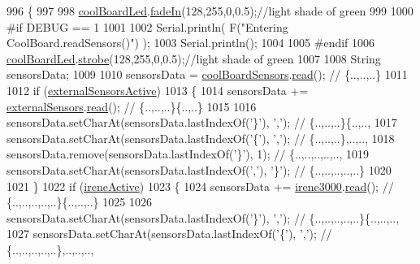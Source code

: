 \begin{DoxyCode}
996 \{
997 
998     \hyperlink{classCoolBoard_a1b1d3c684a5baa56b08486e192fd8e97}{coolBoardLed}.\hyperlink{classCoolBoardLed_ab778f5e7bed0ab74e3906d82110493c3}{fadeIn}(128,255,0,0.5);\textcolor{comment}{//light shade of green}
999                 
1000 \textcolor{preprocessor}{#if DEBUG == 1}
1001 
1002     Serial.println( F(\textcolor{stringliteral}{"Entering CoolBoard.readSensors()"}) );
1003     Serial.println();
1004 
1005 \textcolor{preprocessor}{#endif}
1006     \hyperlink{classCoolBoard_a1b1d3c684a5baa56b08486e192fd8e97}{coolBoardLed}.\hyperlink{classCoolBoardLed_ad5f0de4c628cbfbf49896042831c64ad}{strobe}(128,255,0,0.5);\textcolor{comment}{//light shade of green}
1007 
1008     String sensorsData;
1009 
1010     sensorsData = \hyperlink{classCoolBoard_af102be5288bd7f7a8e59b13f86e26a00}{coolBoardSensors}.\hyperlink{classCoolBoardSensors_a91badb2539d91fda8679f2a597874c48}{read}(); \textcolor{comment}{// \{..,..,..\}}
1011     
1012     \textcolor{keywordflow}{if} (\hyperlink{classCoolBoard_a638b00b76aeb819ecfd4c10b8cdd7bb7}{externalSensorsActive})
1013     \{
1014         sensorsData += \hyperlink{classCoolBoard_a09e26264839c65873eb56af476eff6b2}{externalSensors}.\hyperlink{classExternalSensors_a53177b81eca3be89508b5511ddcd00fc}{read}(); \textcolor{comment}{// \{..,..,..\}\{..,..\}}
1015 
1016         sensorsData.setCharAt(sensorsData.lastIndexOf(\textcolor{charliteral}{'\}'}), \textcolor{charliteral}{','}); \textcolor{comment}{// \{..,..,..\}\{..,..,}
1017         sensorsData.setCharAt(sensorsData.lastIndexOf(\textcolor{charliteral}{'\{'}), \textcolor{charliteral}{','}); \textcolor{comment}{// \{..,..,..\},..,..,}
1018         sensorsData.remove(sensorsData.lastIndexOf(\textcolor{charliteral}{'\}'}), 1); \textcolor{comment}{// \{..,..,..,..,..,}
1019         sensorsData.setCharAt(sensorsData.lastIndexOf(\textcolor{charliteral}{','}), \textcolor{charliteral}{'\}'}); \textcolor{comment}{// \{..,..,..,..,..\}}
1020 
1021     \}
1022     \textcolor{keywordflow}{if} (\hyperlink{classCoolBoard_a9c3f7ac625481ee2ae802a25d97a4ae0}{ireneActive})
1023     \{
1024         sensorsData += \hyperlink{classCoolBoard_ad103718ce316006c4695b8eb312eaf11}{irene3000}.\hyperlink{classIrene3000_a852a170feea994ea1df01c6b245b5d9a}{read}(); \textcolor{comment}{// \{..,..,..,..,..\}\{..,..,..\}}
1025 
1026         sensorsData.setCharAt(sensorsData.lastIndexOf(\textcolor{charliteral}{'\}'}), \textcolor{charliteral}{','}); \textcolor{comment}{// \{..,..,..,..,..\}\{..,..,..,}
1027         sensorsData.setCharAt(sensorsData.lastIndexOf(\textcolor{charliteral}{'\{'}), \textcolor{charliteral}{','}); \textcolor{comment}{// \{..,..,..,..,..\},..,..,..,}

\end{DoxyCode}
